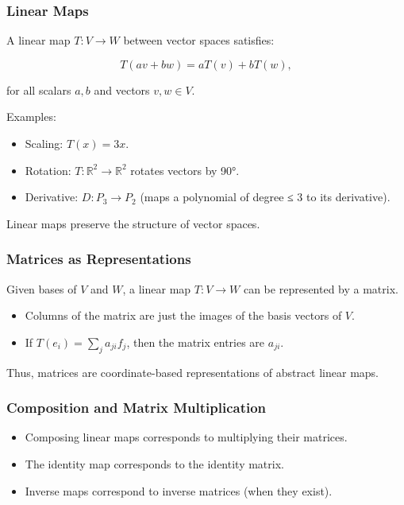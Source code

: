 \documentclass[
  letterpaper,
  DIV=11,
  numbers=noendperiod]{scrreprt}
\providecommand{\tightlist}{%
  \setlength{\itemsep}{0pt}\setlength{\parskip}{0pt}}
\begin{document}
\subsubsection{Linear Maps}\label{linear-maps}

A linear map \(T: V \to W\) between vector spaces satisfies:

\[
T(av + bw) = aT(v) + bT(w),
\]

for all scalars \(a,b\) and vectors \(v,w \in V\).

Examples:

\begin{itemize}
\tightlist
\item
  Scaling: \(T(x) = 3x\).
\item
  Rotation: \(T:\mathbb{R}^2 \to \mathbb{R}^2\) rotates vectors by 90°.
\item
  Derivative: \(D: P_3 \to P_2\) (maps a polynomial of degree ≤ 3 to its
  derivative).
\end{itemize}

Linear maps preserve the structure of vector spaces.

\subsubsection{Matrices as
Representations}\label{matrices-as-representations}

Given bases of \(V\) and \(W\), a linear map \(T: V \to W\) can be
represented by a matrix.

\begin{itemize}
\tightlist
\item
  Columns of the matrix are just the images of the basis vectors of
  \(V\).
\item
  If \(T(e_i) = \sum_j a_{ji} f_j\), then the matrix entries are
  \(a_{ji}\).
\end{itemize}

Thus, matrices are coordinate-based representations of abstract linear
maps.

\subsubsection{Composition and Matrix
Multiplication}\label{composition-and-matrix-multiplication}

\begin{itemize}
\tightlist
\item
  Composing linear maps corresponds to multiplying their matrices.
\item
  The identity map corresponds to the identity matrix.
\item
  Inverse maps correspond to inverse matrices (when they exist).
\end{itemize}
\end{document}
